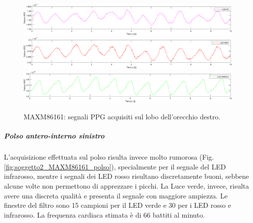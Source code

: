 \begin{figure}[h]
	\centering
	\includegraphics[width=1\linewidth]{ImageFiles/Misure Preliminari/Soggetto 2/maxm86161/lobo_ir_moving_avg}
	\includegraphics[width=1\linewidth]{ImageFiles/Misure Preliminari/Soggetto 2/maxm86161/lobo_red_moving_avg}
	\includegraphics[width=1\linewidth]{ImageFiles/Misure Preliminari/Soggetto 2/maxm86161/lobo_green_moving_avg}
	\caption{MAXM86161: segnali PPG acquisiti sul lobo dell'orecchio destro.}
	\label{fig:soggetto2_MAXM86161_lobo}
\end{figure}

\clearpage

\subparagraph{Polso antero-interno sinistro}
L'acquisizione effettuata sul polso risulta invece molto rumorosa (Fig. \ref{fig:soggetto2_MAXM86161_polso}), specialmente per il segnale del LED infrarosso, mentre i segnali dei LED rosso risultano discretamente buoni, sebbene alcune volte non permettono di apprezzare i picchi. La Luce verde, invece, risulta avere una discreta qualità e presenta il segnale con maggiore ampiezza. Le finestre del filtro sono 15 campioni per il LED verde e 30 per i LED rosso e infrarosso. La frequenza cardiaca stimata è di 66 battiti al minuto.

